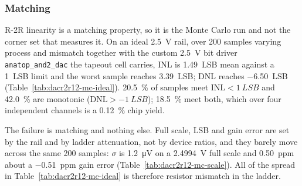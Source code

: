 %
%
%

\subsubsection{Matching}\label{sss:dacr2r12-mc}

R-2R linearity is a matching property, so it is the Monte Carlo run and not the corner
set that measures it. On an ideal \SI{2.5}{\volt} rail, over 200 samples varying process
and mismatch together with the custom \SI{2.5}{\volt} bit driver
\texttt{anatop\_and2\_dac} the tapeout cell carries, INL is \SI{1.49}{LSB} mean
against a \SI{1}{LSB} limit and the worst sample reaches \SI{3.39}{LSB}; DNL reaches
\SI{-6.50}{LSB} (Table~\ref{tab:dacr2r12-mc-ideal}). \SI{20.5}{\percent} of samples
meet \(\mathrm{INL} < \SI{1}{LSB}\) and \SI{42.0}{\percent} are monotonic
(\(\mathrm{DNL} > \SI{-1}{LSB}\)); \SI{18.5}{\percent} meet both, which over four
independent channels is a \SI{0.12}{\percent} chip yield.

The failure is matching and nothing else. Full scale, LSB and gain error are set by the
rail and by ladder attenuation, not by device ratios, and they barely move across the
same 200 samples: \(\sigma\) is \SI{1.2}{\micro\volt} on a \SI{2.4994}{\volt} full
scale and \SI{0.50}{ppm} about a \SI{-0.51}{ppm} gain error
(Table~\ref{tab:dacr2r12-mc-scale}).
All of the spread in Table~\ref{tab:dacr2r12-mc-ideal} is therefore resistor mismatch in
the ladder.

